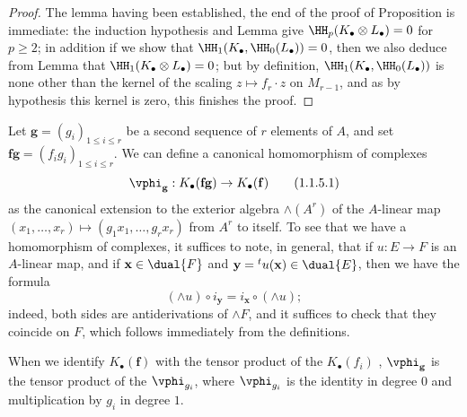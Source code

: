 \begin{proof}
The lemma having been established, the end of the proof of Proposition  is immediate: the induction hypothesis and Lemma  give $\HH_p(K_\bullet\otimes L_\bullet)=0$ for $p\geq 2$; in addition if we show that $\HH_1(K_\bullet,\HH_0(L_\bullet))=0$, then we also deduce from Lemma  that $\HH_1(K_\bullet\otimes L_\bullet)=0$; but by definition, $\HH_1(K_\bullet,\HH_0(L_\bullet))$ is none other than the kernel of the scaling $z\mapsto f_r\cdot z$ on $M_{r-1}$, and as by hypothesis this kernel is zero, this finishes the proof.
\end{proof}

\begin{env}[1.1.5]
\label{III.1.1.5}
Let $\mathbf{g}=(g_i)_{1\leq i\leq r}$ be a second sequence of $r$ elements of $A$, and set $\mathbf{f}\mathbf{g}=(f_i g_i)_{1\leq i\leq r}$.
We can define a canonical homomorphism of complexes
\[
  \vphi_\mathbf{g}:K_\bullet(\mathbf{f}\mathbf{g})\to K_\bullet(\mathbf{f})
  \tag{1.1.5.1}
\]
as the canonical extension to the exterior algebra $\wedge(A^r)$ of the $A$-linear map $(x_1,\dots,x_r)\mapsto(g_1 x_1,\dots,g_r x_r)$ from $A^r$ to itself.
To see that we have a homomorphism of complexes, it suffices to note, in general, that if $u:E\to F$ is an $A$-linear map, and if $\mathbf{x}\in\dual{F}$ and $\mathbf{y}={}^t u(\mathbf{x})\in\dual{E}$, then we have the formula
\[
  (\wedge u)\circ i_\mathbf{y}=i_\mathbf{x}\circ(\wedge u);
  \tag{1.1.5.2}
\]
indeed, both sides are antiderivations of $\wedge F$, and it suffices to check that they coincide on $F$, which follows immediately from the definitions.

When we identify $K_\bullet(\mathbf{f})$ with the tensor product of the $K_\bullet(f_i)$ , $\vphi_\mathbf{g}$ is the tensor product of the $\vphi_{g_i}$, where $\vphi_{g_i}$ is the identity in degree $0$ and multiplication by $g_i$ in degree $1$.
\end{env}

